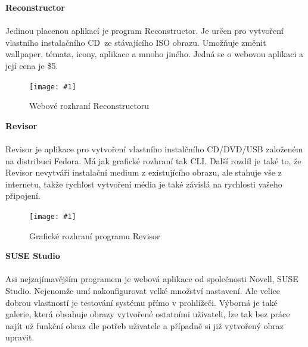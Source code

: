 \documentclass[a4paper,12pt]{article}
\newcommand{\nadpis}[1]{%
	\vspace{4 mm}
	\textbf{#1}\\
	\vspace{4 mm}
	}
\newcommand{\obr}[3]{%
	\begin{figure}[h]
	\center\texttt{[image: \#1]}
	\caption{#3}
	\end{figure}
	}
\begin{document}
\nadpis{Reconstructor}\\
Jedinou placenou aplikací je program Reconstructor. Je určen pro vytvoření vlastního instalačního CD ze stávajícího ISO obrazu. Umožňuje změnit wallpaper, témata, icony, aplikace a mnoho jiného.
Jedná se o webovou aplikaci a její cena je \$5.\cite{Linux_Build}
\begin{center}
\obr{./img/screens/reconstructor.jpg}{0.5}{Webové rozhraní Reconstructoru}
\end{center}
\newpage
\nadpis{Revisor}\\
Revisor je aplikace pro vytvoření vlastního instalčního CD/DVD/USB založeném na distribuci Fedora. Má jak grafické rozhraní tak CLI. Další rozdíl je také to, že Revisor nevytváří instalační medium z existujícího obrazu, ale stahuje vše z internetu, takže rychlost vytvoření média je také závislá na rychlosti vašeho připojení.\cite{Linux_Build}
\begin{center}
\obr{./img/screens/revisor.jpg}{0.7}{Grafické rozhraní programu Revisor}
\end{center}
\nadpis{SUSE Studio}\\
Asi nejzajímavějším programem je webová aplikace od společnosti Novell, SUSE Studio. Nejenomže umí nakonfigurovat velké množství nastavení. Ale velice dobrou vlastností je testování systému přímo v prohlížeči. Výborná je také galerie, která obsahuje obrazy vytvořené ostatními uživateli, lze tak bez práce najít už funkční obraz dle potřeb uživatele a případně si již vytvořený obraz upravit.
\end{document}
